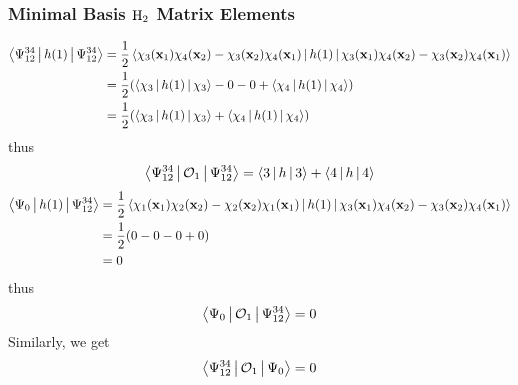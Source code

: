 \documentclass[a4paper]{article}
\begin{document}
\subsubsection{Minimal Basis $ \ce{H_2} $ Matrix Elements}
\label{2.8}
\begin{equation}\label{key}
\begin{aligned}
\Braket{\Psi_{12}^{34} | h(1) | \Psi_{12}^{34}} &= \dfrac{1}{2}\Braket{\chi_3(\vb{x}_1)\chi_4(\vb{x}_2) - \chi_3(\vb{x}_2)\chi_4(\vb{x}_1) | h(1) | \chi_3(\vb{x}_1)\chi_4(\vb{x}_2) - \chi_3(\vb{x}_2)\chi_4(\vb{x}_1)}\\
&= \dfrac{1}{2}\qty(\Braket{\chi_3|h(1)|\chi_3} - 0 - 0 + \Braket{\chi_4|h(1)|\chi_4})\\
&= \dfrac{1}{2}\qty(\Braket{\chi_3|h(1)|\chi_3} + \Braket{\chi_4|h(1)|\chi_4})
\end{aligned}
\end{equation}
thus
\begin{equation}\label{key}
\Braket{\Psi_{12}^{34} | \mathcal{O}_1 | \Psi_{12}^{34}} = \Braket{3|h|3} + \Braket{4|h|4}
\end{equation}
\begin{equation}\label{key}
\begin{aligned}
\Braket{\Psi_0 | h(1) | \Psi_{12}^{34}} &= \dfrac{1}{2}\Braket{\chi_1(\vb{x}_1)\chi_2(\vb{x}_2) - \chi_2(\vb{x}_2)\chi_1(\vb{x}_1) | h(1) | \chi_3(\vb{x}_1)\chi_4(\vb{x}_2) - \chi_3(\vb{x}_2)\chi_4(\vb{x}_1)}\\
&= \dfrac{1}{2}\qty(0 - 0 - 0 + 0)\\
&= 0
\end{aligned}
\end{equation}
thus
\begin{equation}\label{key}
\Braket{\Psi_0 | \mathcal{O}_1 | \Psi_{12}^{34}} = 0
\end{equation}
Similarly, we get
\begin{equation}\label{key}
\Braket{\Psi_{12}^{34} | \mathcal{O}_1 | \Psi_0} = 0
\end{equation}
\end{document}
